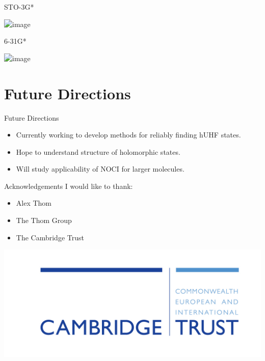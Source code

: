 \documentclass{beamer}
\begin{document}
\begin{frame}{ STO-3G*}
 \vspace{-1em}
 \begin{center}
  \includegraphics<1->[scale=0.4]{HoloHF/H2holo-3}
 \end{center}
\end{frame} 

\begin{frame}{ 6-31G*}
 \vspace{-1em}
 \begin{center}
  \includegraphics<1->[scale=0.4]{HoloHF/H2_4basis}
 \end{center}
\end{frame} 

\section{Future Directions}
\begin{frame}{Future Directions}
 \begin{itemize}
  \item<1->{Currently working to develop methods for reliably finding hUHF states.}
  \item<2->{Hope to understand structure of holomorphic states.}
  \item<3->{Will study applicability of NOCI for larger molecules.}
 \end{itemize}
\end{frame}

\begin{frame}{Acknowledgements}
 I would like to thank:
 
 \begin{itemize}
  \item{Alex Thom}
  \item{The Thom Group}
  \item{The Cambridge Trust}
 \end{itemize}
 \begin{center}
  \includegraphics[scale=0.7]{CT_logo.jpg}
 \end{center}
\end{frame}
\end{document}
